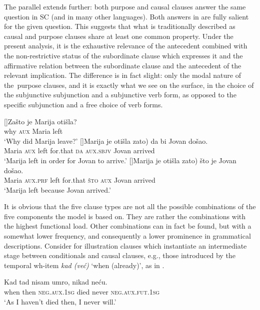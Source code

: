 \documentclass[output=paper]{langscibook}
\begin{document}
\noindent The parallel extends further: both purpose and causal clauses answer the same question in SC (and in many other languages). Both answers in  are fully salient for the given question. This suggests that what is traditionally described as causal and purpose clauses share at least one common property. Under the present analysis, it is the exhaustive relevance of the antecedent combined with the non-restrictive status of the subordinate clause which expresses it and the affirmative relation between the subordinate clause and the antecedent of the relevant implication. The difference is in fact slight: only the modal nature of the~purpose clauses, and it is exactly what we see on the surface, in the choice of the subjunctive subjunction and a subjunctive verb form, as opposed to the specific subjunction and a free choice of verb forms.

\ea\label{ex:Zašto}
\begin{xlist}
    []{\gll Zašto je Marija otišla?\\
    why \textsc{aux} Maria left\\
    \glt `Why did Marija leave?'}
    []{\gll Marija je otišla \minsp{(} zato) da bi Jovan došao.\\
    Maria \textsc{aux} left {} for.that \textsc{da} \textsc{aux.sbjv} Jovan arrived\\
    \glt `Marija left in order for Jovan to arrive.'}
    []{\gll Marija je otišla \minsp{(} zato) što je Jovan došao.\\
    Maria \textsc{aux.prf} left {} for.that \textsc{što} \textsc{aux} Jovan arrived\\
\glt `Marija left because Jovan arrived.'}
\end{xlist}
\z

\noindent It is obvious that the five clause types are not all the possible combinations of the five components the model is based on. They are rather the combinations with the highest functional load. Other combinations can in fact be found, but with a somewhat lower frequency, and consequently a lower prominence in grammatical descriptions. Consider for illustration clauses which instantiate an intermediate stage between conditionals and causal clauses, e.g., those introduced by the temporal wh-item \textit{kad (već)} `when (already)', as in .

\ea\label{ex:kad}
    \gll Kad tad nisam umro, nikad neću.\\
    when then \textsc{neg.aux.1sg} died never \textsc{neg.aux.fut.1sg}\\
    \glt `As I haven't died then, I never will.'
\z
\end{document}
